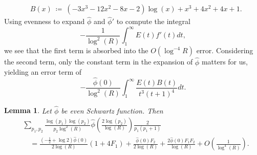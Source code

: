 \documentclass[11pt, reqno]{amsart}
\makeatletter
\renewenvironment{proof}[1][\proofname]{\par
  \vspace{-.7\topsep}%
  \pushQED{\qed}%
  \normalfont
  \topsep0pt \partopsep0pt %
  \trivlist
  \item[\hskip\labelsep
        \itshape
    #1\@addpunct{.}]\ignorespaces
}{%
  \popQED\endtrivlist\@endpefalse
  \addvspace{6pt plus 6pt} %
}
\newtheorem{lemma}[theorem]{Lemma}
\theoremstyle{definition}
\theoremstyle{remark}
\numberwithin{equation}{section}
\renewcommand{\hat}{\widehat}
\makeatother
\begin{document}
\begin{proof}
\begin{align}
        &B(x)\ \coloneq \ (-3x^3-12x^2-8x-2)\log(x)+x^3+4x^2+4x+1.
    \end{align}
    Using evenness to expand $\hat\phi$ and $\hat\phi'$ to compute the integral
    \begin{equation}
        -\frac{1}{\log^2(R)}\int_1^\infty E(t)f'(t)dt,
    \end{equation}
    we see that the first term is absorbed into the $O(\log^{-4}R)$ error. 
    Considering the second term, only the constant term in the expansion of $\hat\phi$ matters for us, yielding an error term of
    \begin{equation}
        -\frac{\hat\phi(0)}{\log^2(R)}\int_1^\infty \frac{E(t)B(t)}{t^3(t+1)^4}dt. 
    \end{equation} %
\end{proof}
\begin{lemma}\label{lem:line1}
    Let $\hat\phi$ be even Schwartz function. Then
    \begin{equation}
    \begin{aligned}
    &\sum_{p_1,p_2}\frac{\log(p_1)\log(p_2)}{p_2\log^2(R)}\hat\phi\left(\frac{2\log(p_2)}{\log(R)}\right)\frac{2}{p_1(p_1+1)}\\
    &\quad =\frac{\left(-\frac{1}{2}+\log 2\right)\hat\phi(0)}{2\log(R)}\left(1+4F_1\right)+\frac{\hat\phi(0)F_2}{2\log(R)}+\frac{2\hat\phi(0)F_1F_2}{\log(R)}+O\left(\frac{1}{\log^4(R)}\right).
    \end{aligned}
    \end{equation}
\end{lemma}
\end{document}
